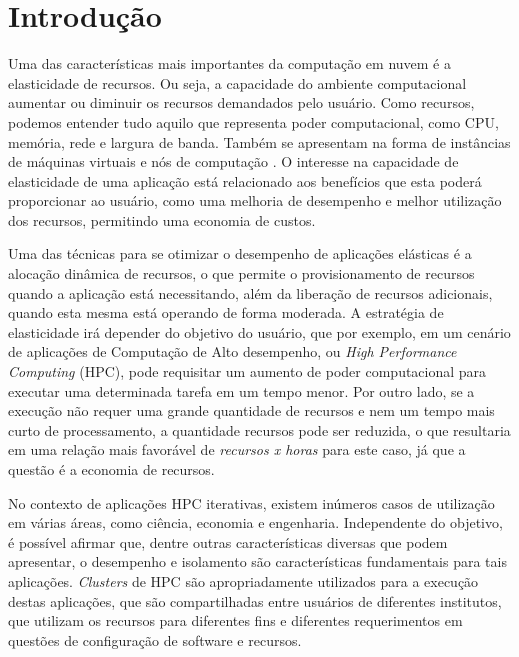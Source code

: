 \documentclass[twoside,english,brazilian]{UNISINOSmonografia}
\begin{document}
\tableofcontents

\chapter{Introdução}


Uma das características mais importantes da computação em nuvem é a elasticidade de recursos. Ou seja, a capacidade do ambiente computacional aumentar ou diminuir os recursos demandados pelo usuário. Como recursos, podemos entender tudo aquilo que representa poder computacional, como CPU, memória, rede e largura de banda. Também se apresentam na forma de instâncias de máquinas virtuais e nós de computação \cite{Bender2014}. O interesse na capacidade de elasticidade de uma aplicação está relacionado aos benefícios que esta poderá proporcionar ao usuário, como uma melhoria de desempenho e melhor utilização dos recursos, permitindo uma economia de custos. 

Uma das técnicas para se otimizar o desempenho de aplicações elásticas é a alocação dinâmica de recursos, o que permite o provisionamento de recursos quando a aplicação está necessitando, além da liberação de recursos adicionais, quando esta mesma está operando de forma moderada. A estratégia de elasticidade irá depender do objetivo do usuário, que por exemplo, em um cenário de aplicações de Computação de Alto desempenho, ou \textit{High Performance Computing} (HPC), pode requisitar um aumento de poder computacional para executar uma determinada tarefa em um tempo menor. Por outro lado, se a execução não requer uma grande quantidade de recursos e nem um tempo mais curto de processamento, a quantidade recursos pode ser reduzida, o que resultaria em uma relação mais favorável de \textit{recursos x horas} para este caso, já que a questão é a economia de recursos.

No contexto de aplicações HPC iterativas, existem inúmeros casos de utilização em várias áreas, como ciência, economia e engenharia. Independente do objetivo, é possível afirmar que, dentre outras características diversas que podem apresentar, o desempenho e isolamento são características fundamentais para tais aplicações. \textit{Clusters} de HPC são apropriadamente utilizados para a execução destas aplicações, que são compartilhadas entre usuários de diferentes institutos, que utilizam os recursos para diferentes fins e diferentes requerimentos em questões de configuração de software e recursos. 
\end{document}
